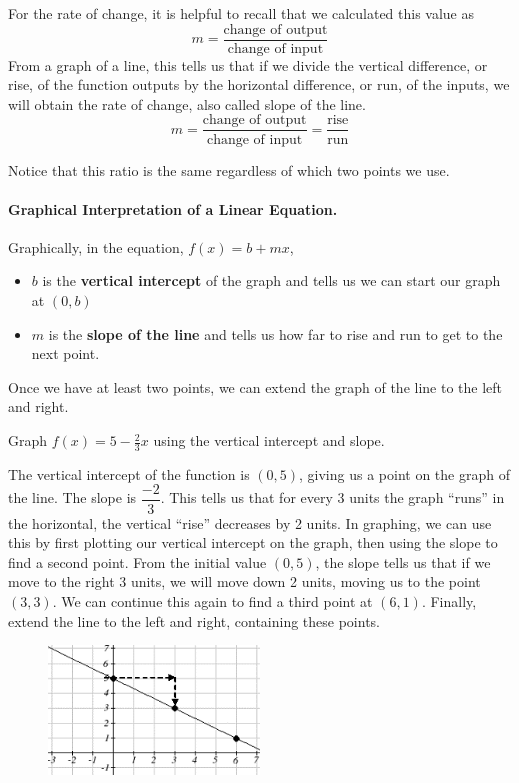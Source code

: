 For the rate of change, it is helpful to recall that we calculated this value as
$$m = \frac{\mbox{change of output}}{\mbox{change of input}}$$
From a graph of a line, this tells us that if we divide the vertical difference, or rise, of the function outputs by the horizontal difference, or run, of the inputs, we will obtain the rate of change, also called slope of the line.
$$m = \frac{\mbox{change of output}}{\mbox{change of input}} = \frac{\mbox{rise}}{\mbox{run}}$$


Notice that this ratio is the same regardless of which two points we use.

\paragraph{Graphical Interpretation of a Linear Equation.} Graphically, in the equation, $f(x) = b+mx$,
  \begin{itemize}
    \item $b$ is the \textbf{vertical intercept} of the graph and tells us we can start our graph at $(0, b)$
    \item $m$ is the \textbf{slope of the line} and tells us how far to rise and run to get to the next point.
  \end{itemize}
Once we have at least two points, we can extend the graph of the line to the left and right.

\begin{example}
Graph $f(x) = 5 - \frac{2}{3} x$ using the vertical intercept and slope.

\begin{solution} The vertical intercept of the function is $(0, 5)$, giving us a point on the graph of the line. The slope is $\dfrac{-2}{3}$. This tells us that for every 3 units the graph ``runs'' in the horizontal, the vertical ``rise'' decreases by 2 units. In graphing, we can use this by first plotting our vertical intercept on the graph, then using the slope to find a second point. From the initial value $(0, 5)$, the slope tells us that if we move to the right 3 units, we will move down 2 units, moving us to the point $(3, 3)$. We can continue this again to find a  third point at $(6, 1)$. Finally, extend the line to the left and right, containing these points.
\begin{figure}[!ht]
\centering
\includegraphics[width=0.5\textwidth]{img/chap1/sec1-4/image049.png}
\caption{}
\end{figure}

\end{solution}\end{example}

